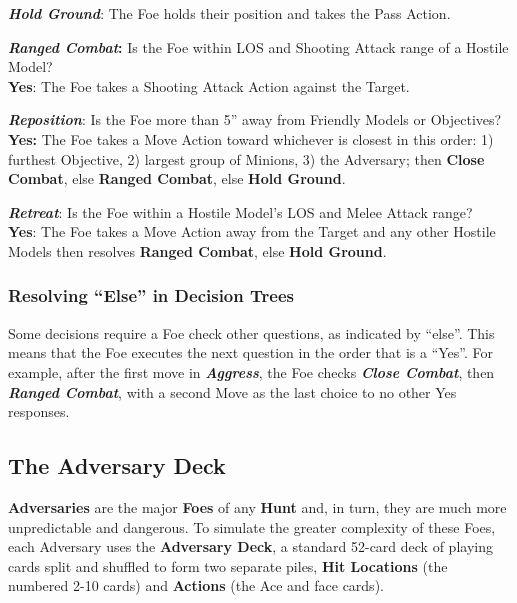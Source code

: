 \documentclass[
]{book}
\begin{document}
\textbf{\emph{Hold Ground}}: The Foe holds their position and takes the Pass Action.

\textbf{\emph{Ranged Combat}:} Is the Foe within LOS and Shooting Attack range of a Hostile Model?\\
\hspace*{0.333em} \textbf{Yes}: The Foe takes a Shooting Attack Action against the Target.

\textbf{\emph{Reposition}}: Is the Foe more than 5'' away from Friendly Models or Objectives?\\
\hspace*{0.333em} \textbf{Yes:} The Foe takes a Move Action toward whichever is closest in this order: 1) furthest Objective, 2) largest group of Minions, 3) the Adversary; then \textbf{Close Combat}, else \textbf{Ranged Combat}, else \textbf{Hold Ground}.

\textbf{\emph{Retreat}}: Is the Foe within a Hostile Model's LOS and Melee Attack range?\\
\hspace*{0.333em} \textbf{Yes}: The Foe takes a Move Action away from the Target and any other Hostile Models then resolves \textbf{Ranged Combat}, else \textbf{Hold Ground}.

\hypertarget{else}{%
\subsubsection*{Resolving ``Else'' in Decision Trees}\label{else}}

Some decisions require a Foe check other questions, as indicated by ``else''. This means that the Foe executes the next question in the order that is a ``Yes''. For example, after the first move in \textbf{\emph{Aggress}}, the Foe checks \textbf{\emph{Close Combat}}, then \textbf{\emph{Ranged Combat}}, with a second Move as the last choice to no other Yes responses.

\hypertarget{adeck}{%
\subsection*{The Adversary Deck}\label{adeck}}

\textbf{Adversaries} are the major \textbf{Foes} of any \textbf{Hunt} and, in turn, they are much more unpredictable and dangerous. To simulate the greater complexity of these Foes, each Adversary uses the \textbf{Adversary Deck}, a standard 52-card deck of playing cards split and shuffled to form two separate piles, \textbf{Hit Locations} (the numbered 2-10 cards) and \textbf{Actions} (the Ace and face cards).
\end{document}
